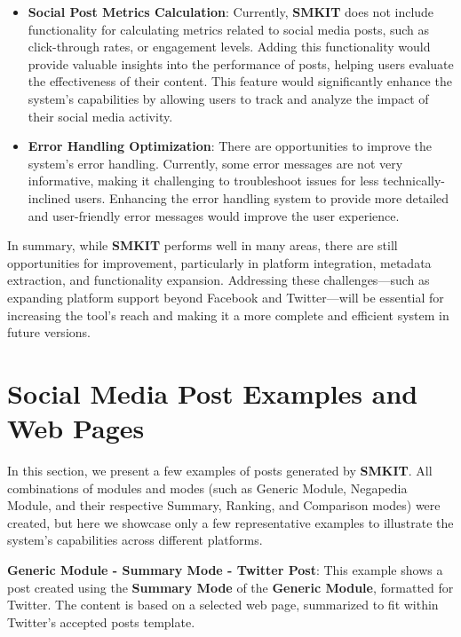 \begin{itemize}
    \item \textbf{Social Post Metrics Calculation}: 
    Currently, \textbf{SMKIT} does not include functionality for calculating metrics related to social media posts, such as click-through rates, or engagement levels. Adding this functionality would provide valuable insights into the performance of posts, helping users evaluate the effectiveness of their content. This feature would significantly enhance the system's capabilities by allowing users to track and analyze the impact of their social media activity.
    
    \item \textbf{Error Handling Optimization}: There are opportunities to improve the system’s error handling. Currently, some error messages are not very informative, making it challenging to troubleshoot issues for less technically-inclined users. Enhancing the error handling system to provide more detailed and user-friendly error messages would improve the user experience.
\end{itemize}

In summary, while \textbf{SMKIT} performs well in many areas, there are still opportunities for improvement, particularly in platform integration, metadata extraction, and functionality expansion. Addressing these challenges—such as expanding platform support beyond Facebook and Twitter—will be essential for increasing the tool's reach and making it a more complete and efficient system in future versions.


\section{Social Media Post Examples and Web Pages}
\label{sec:social_media_post_examples_and_web_pages}
In this section, we present a few examples of posts generated by \textbf{SMKIT}. All combinations of modules and modes (such as Generic Module, Negapedia Module, and their respective Summary, Ranking, and Comparison modes) were created, but here we showcase only a few representative examples to illustrate the system's capabilities across different platforms.

\textbf{Generic Module - Summary Mode - Twitter Post}:  
This example shows a post created using the \textbf{Summary Mode} of the \textbf{Generic Module}, formatted for Twitter. The content is based on a selected web page, summarized to fit within Twitter’s accepted posts template.

